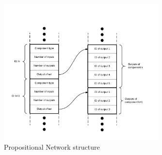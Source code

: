 \begin{figure}[h]
	\centering
	\includegraphics[width=0.75\textwidth]{images/PropNet_Structure.pdf}
	\caption{Propositional Network structure}
	\label{fig:propnet_structure}
\end{figure}


